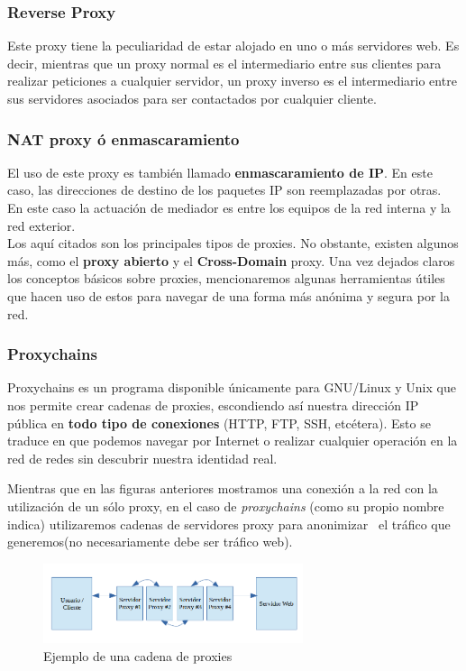 \subsubsection{Reverse Proxy}

Este proxy tiene la peculiaridad de estar alojado en uno o más servidores web.
Es decir, mientras que un proxy normal es el intermediario entre sus clientes para realizar peticiones a cualquier servidor, un proxy inverso es el intermediario entre sus servidores asociados para ser contactados por cualquier cliente.~\cite{article:proxy_rev}

\subsubsection{NAT proxy ó enmascaramiento}

El uso de este proxy es también llamado \textbf{enmascaramiento de IP}. En este caso, las direcciones de destino de los paquetes IP son reemplazadas por otras. ~\cite{article:nat}
En este caso la actuación de mediador es entre los equipos de la red interna y la red exterior.\\

Los aquí citados son los principales tipos de proxies. No obstante, existen algunos más, como el \textbf{proxy abierto} y el \textbf{Cross-Domain }proxy.
Una vez dejados claros los conceptos básicos sobre proxies, mencionaremos algunas herramientas útiles que hacen uso de estos para navegar de una forma más anónima y segura por la red.

\subsubsection{Proxychains}

Proxychains es un programa disponible únicamente para GNU/Linux y Unix que nos permite crear cadenas de proxies, escondiendo así nuestra dirección IP pública en \textbf{todo tipo de conexiones} (HTTP, FTP, SSH, etcétera). 
Esto se traduce en que podemos navegar por Internet o realizar cualquier operación en la red de redes sin descubrir nuestra identidad real.

Mientras que en las figuras anteriores mostramos una conexión a la red con la utilización de un sólo proxy, en el caso de \textit{proxychains} (como su propio nombre indica) utilizaremos cadenas de servidores proxy para anonimizar~\cite{article:proxychains} el tráfico que generemos(no necesariamente debe ser tráfico web).

\begin{figure}[h]
	\centerline{
		\mbox{\includegraphics[width=3.00in]{images/proxy_chain.png}}
	}
	\caption{Ejemplo de una cadena de proxies}
	\label{fig:proxy_chain}
\end{figure}

